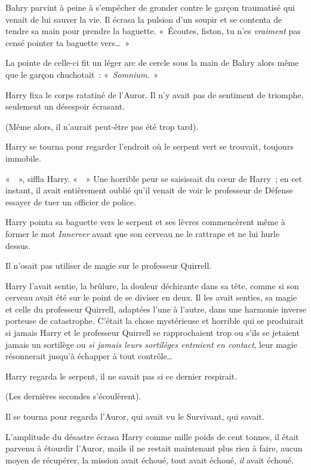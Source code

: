 Bahry parvint à peine à s'empêcher de gronder contre le garçon traumatisé qui venait de lui sauver la vie.
Il écrasa la pulsion d'un soupir et se contenta de tendre sa main pour prendre la baguette.
«~Écoutes, fiston, tu n'es \emph{vraiment} pas censé pointer ta baguette vers…~»

La pointe de celle-ci fit un léger arc de cercle sous la main de Bahry alors même que le garçon chuchotait~: «~\emph{Somnium}.~»

\later

Harry fixa le corps ratatiné de l'Auror.
Il n'y avait pas de sentiment de triomphe, seulement un désespoir écrasant.

(Même alors, il n'aurait peut-être pas été trop tard).

Harry se tourna pour regarder l'endroit où le serpent vert se trouvait, toujours immobile.

«~~», siffla Harry.
«~~» Une horrible peur se saisissait du cœur de Harry~; en cet instant, il avait entièrement oublié qu'il venait de voir le professeur de Défense essayer de tuer un officier de police.

Harry pointa sa baguette vers le serpent et ses lèvres commencèrent même à former le mot \emph{Innerver} avant que son cerveau ne le rattrape et ne lui hurle dessus.

Il n'osait pas utiliser de magie sur le professeur Quirrell.

Harry l'avait sentie, la brûlure, la douleur déchirante dans sa tête, comme si son cerveau avait été sur le point de se diviser en deux.
Il les avait senties, sa magie et celle du professeur Quirrell, adaptées l'une à l'autre, dans une harmonie inverse porteuse de catastrophe.
C'était la chose mystérieuse et horrible qui se produirait si jamais Harry et le professeur Quirrell se rapprochaient trop ou s'ils se jetaient jamais un sortilège ou \emph{si jamais leurs sortilèges entraient en contact}, leur magie résonnerait jusqu'à échapper à tout contrôle…

Harry regarda le serpent, il ne savait pas si ce dernier respirait.

(Les dernières secondes s'écoulèrent).

Il se tourna pour regarda l'Auror, qui avait vu le Survivant, qui savait.

L'amplitude du désastre écrasa Harry comme mille poids de cent tonnes, il était parvenu à étourdir l'Auror, mails il ne restait maintenant plus rien à faire, aucun moyen de récupérer, la mission avait échoué, tout avait échoué, \emph{il} avait échoué.

